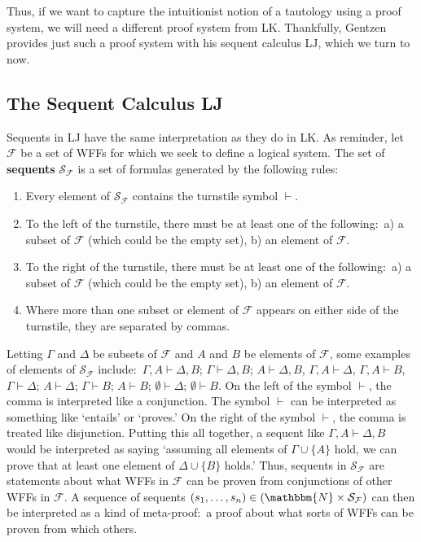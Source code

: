 \documentclass[11pt]{article}
\theoremstyle{definition}
\theoremstyle{remark}
\begin{document}
Thus, if we want to capture the intuitionist notion of a tautology using a proof system, we will need a different proof system from LK. Thankfully, Gentzen provides just such a proof system with his sequent calculus LJ, which we turn to now.

\subsection{The Sequent Calculus LJ}
Sequents in LJ have the same interpretation as they do in LK. As reminder, let $\mathcal{F}$ be a set of WFFs for which we seek to define a logical system. The set of \textbf{sequents} $\mathcal{S}_{\mathcal{F}}$ is a set of formulas generated by the following rules:
\begin{enumerate}
    \item Every element of $\mathcal{S}_{\mathcal{F}}$ contains the turnstile symbol $\vdash$. 

    \item To the left of the turnstile, there must be at least one of the following:\ a) a subset of $\mathcal{F}$ (which could be the empty set), b) an element of $\mathcal{F}$. 

    \item To the right of the turnstile, there must be at least one of the following:\ a) a subset of $\mathcal{F}$ (which could be the empty set), b) an element of $\mathcal{F}$. 

    \item Where more than one subset or element of $\mathcal{F}$ appears on either side of the turnstile, they are separated by commas. 
\end{enumerate}
Letting $\Gamma$ and $\Delta$ be subsets of $\mathcal{F}$ and $A$ and $B$ be elements of $\mathcal{F}$, some examples of elements of $\mathcal{S}_{\mathcal{F}}$ include:\ $\Gamma,A\vdash\Delta,B$; $\Gamma\vdash\Delta,B$; $A\vdash\Delta,B$, $\Gamma,A\vdash\Delta$, $\Gamma,A\vdash B$, $\Gamma\vdash\Delta$; $A\vdash\Delta$; $\Gamma\vdash B$; $A\vdash B$; $\emptyset\vdash\Delta$; $\emptyset\vdash B$. On the left of the symbol $\vdash$, the comma is interpreted like a conjunction. The symbol $\vdash$ can be interpreted as something like `entails' or `proves.' On the right of the symbol $\vdash$, the comma is treated like disjunction. Putting this all together, a sequent like $\Gamma,A\vdash\Delta,B$ would be interpreted as saying `assuming all elements of $\Gamma\cup\{A\}$ hold, we can prove that at least one element of $\Delta\cup\{B\}$ holds.' Thus, sequents in $\mathcal{S}_{\mathcal{F}}$ are statements about what WFFs in $\mathcal{F}$ can be proven from conjunctions of other WFFs in $\mathcal{F}$. A sequence of sequents $(s_{1},\dots,s_{n})\in (\mathbbm{N}\times\mathcal{S}_{\mathcal{F}})$ can then be interpreted as a kind of meta-proof:\ a proof about what sorts of WFFs can be proven from which others.\par
\end{document}
